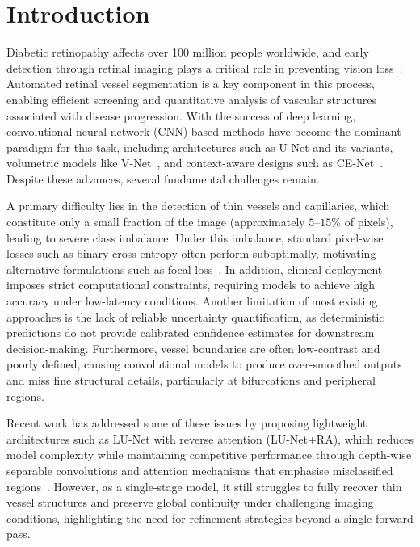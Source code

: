 \documentclass[journal,article,submit,pdftex,moreauthors]{Definitions/mdpi}
\begin{document}
\section{Introduction}

Diabetic retinopathy affects over 100 million people worldwide, and early detection through retinal imaging plays a critical role in preventing vision loss~\cite{WHO2021}. Automated retinal vessel segmentation is a key component in this process, enabling efficient screening and quantitative analysis of vascular structures associated with disease progression. With the success of deep learning, convolutional neural network (CNN)-based methods have become the dominant paradigm for this task, including architectures such as U-Net and its variants, volumetric models like V-Net~\cite{Milletari2016}, and context-aware designs such as CE-Net~\cite{Gu2019CENet}. Despite these advances, several fundamental challenges remain.

A primary difficulty lies in the detection of thin vessels and capillaries, which constitute only a small fraction of the image (approximately $5$--$15\%$ of pixels), leading to severe class imbalance. Under this imbalance, standard pixel-wise losses such as binary cross-entropy often perform suboptimally, motivating alternative formulations such as focal loss~\cite{Lin2017}. In addition, clinical deployment imposes strict computational constraints, requiring models to achieve high accuracy under low-latency conditions. Another limitation of most existing approaches is the lack of reliable uncertainty quantification, as deterministic predictions do not provide calibrated confidence estimates for downstream decision-making. Furthermore, vessel boundaries are often low-contrast and poorly defined, causing convolutional models to produce over-smoothed outputs and miss fine structural details, particularly at bifurcations and peripheral regions.

Recent work has addressed some of these issues by proposing lightweight architectures such as LU-Net with reverse attention (LU-Net+RA), which reduces model complexity while maintaining competitive performance through depth-wise separable convolutions and attention mechanisms that emphasise misclassified regions~\cite{Hernandez2025}. However, as a single-stage model, it still struggles to fully recover thin vessel structures and preserve global continuity under challenging imaging conditions, highlighting the need for refinement strategies beyond a single forward pass.
\end{document}
